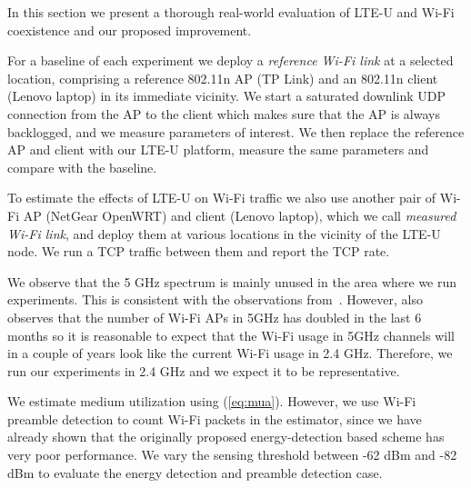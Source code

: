 In this section we present a thorough real-world evaluation of LTE-U and Wi-Fi coexistence and our proposed improvement. 



For a baseline of each experiment we deploy a {\em reference Wi-Fi link} at a selected location, comprising a reference 802.11n AP (TP Link) and an 802.11n client (Lenovo laptop) in its immediate vicinity. We start a saturated downlink UDP connection from the AP to the client which makes sure that the AP is always backlogged, and we measure parameters of interest. We then replace the reference AP and client with our LTE-U platform, measure the same parameters and compare with the baseline. 

To estimate the effects of LTE-U on Wi-Fi traffic we also use another pair of Wi-Fi AP (NetGear OpenWRT) and client (Lenovo laptop), which we call {\em measured Wi-Fi link}, and deploy them at various locations in the vicinity of the LTE-U node. We run a TCP traffic between them and report the TCP rate. 

We observe that the 5 GHz spectrum is mainly unused in the area where we run experiments. This is consistent with the observations from~\cite{meraki_sigcomm15}. However, \cite{meraki_sigcomm15} also observes that the number of Wi-Fi APs in 5GHz has doubled in the last 6 months so it is reasonable to expect that the Wi-Fi usage in 5GHz channels will in a couple of years look like the current Wi-Fi usage in 2.4 GHz. Therefore, we run our experiments in 2.4 GHz and we expect it to be representative.

We estimate medium utilization using (\ref{eq:mua}). However, we use Wi-Fi preamble detection to count Wi-Fi packets in the estimator, since we have already shown that the originally proposed energy-detection based scheme has very poor performance.
We vary the sensing threshold between -62 dBm and -82 dBm to evaluate the energy detection and preamble detection case.  





\label{sec:wild}

